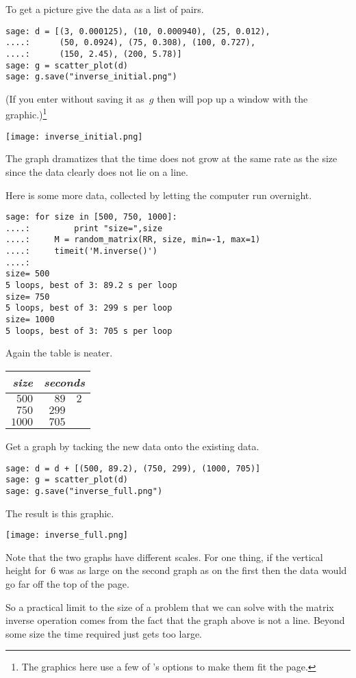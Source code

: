 To get a picture give \Sage{} the data as a list of pairs.
\begin{lstlisting}
sage: d = [(3, 0.000125), (10, 0.000940), (25, 0.012),  
....:      (50, 0.0924), (75, 0.308), (100, 0.727), 
....:      (150, 2.45), (200, 5.78)]
sage: g = scatter_plot(d)
sage: g.save("inverse_initial.png")            
\end{lstlisting}
(If you enter  without saving
it as~$g$ then \Sage{} will pop up a window with the
graphic.)\footnote{The graphics here use a few of \protect\Sage's options
to make them fit the page.}
\begin{center}
  \texttt{[image: inverse\_initial.png]}
\end{center}
The graph dramatizes that the time does not grow at the same rate as the size
since the data clearly does not lie on a line.

Here is some more data, collected by letting the computer run overnight.
\begin{lstlisting}
sage: for size in [500, 750, 1000]:                             
....:         print "size=",size
....:     M = random_matrix(RR, size, min=-1, max=1)
....:     timeit('M.inverse()')
....: 
size= 500
5 loops, best of 3: 89.2 s per loop
size= 750
5 loops, best of 3: 299 s per loop
size= 1000
5 loops, best of 3: 705 s per loop
\end{lstlisting}
Again the table is neater.
\begin{center}
  \begin{tabular}{r|r@{.}l}
    \textit{size}     &\multicolumn{2}{c}{\textit{seconds}}  \\  \hline
    $500$       &$89$ &$2$ \\
    $750$       &$299$ &   \\
    $1000$      &$705$ &   
  \end{tabular}
\end{center}
Get a graph by tacking the new data onto the existing data.
\begin{lstlisting}
sage: d = d + [(500, 89.2), (750, 299), (1000, 705)]
sage: g = scatter_plot(d)                           
sage: g.save("inverse_full.png")                      
\end{lstlisting}
The result is this graphic.
\begin{center}
  \texttt{[image: inverse\_full.png]}
\end{center}
Note that the two graphs have different scales.
For one thing, 
if the vertical height for~$6$ was as large on the second graph as 
on the first then the data would go far off the top of the page.

So a practical limit to the size of a problem that we can solve with
the matrix inverse operation comes from the fact that the graph above is
not a line.
Beyond some size the time required just gets too large. 

\endinput


TODO:
